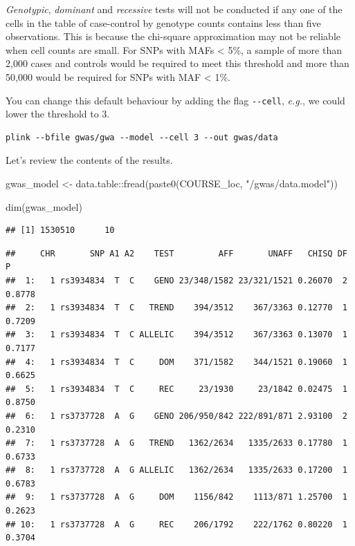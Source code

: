 \documentclass[
]{book}
\newenvironment{Shaded}{\begin{snugshade}}{\end{snugshade}}
\newcommand{\DecValTok}[1]{\textcolor[rgb]{0.00,0.00,0.81}{#1}}
\newcommand{\FunctionTok}[1]{\textcolor[rgb]{0.00,0.00,0.00}{#1}}
\newcommand{\NormalTok}[1]{#1}
\newcommand{\OtherTok}[1]{\textcolor[rgb]{0.56,0.35,0.01}{#1}}
\newcommand{\SpecialCharTok}[1]{\textcolor[rgb]{0.00,0.00,0.00}{#1}}
\newcommand{\StringTok}[1]{\textcolor[rgb]{0.31,0.60,0.02}{#1}}
\begin{document}
\emph{Genotypic}, \emph{dominant} and \emph{recessive} tests will not be conducted if any one of the cells in the table of case-control by genotype counts contains less than five observations. This is because the chi-square approximation may not be reliable when cell counts are small. For SNPs with MAFs \textless{} 5\%, a sample of more than 2,000 cases and controls would be required to meet this threshold and more than 50,000 would be required for SNPs with MAF \textless{} 1\%.

You can change this default behaviour by adding the flag \texttt{-\/-cell}, \emph{e.g.}, we could lower the threshold to 3.

\begin{verbatim}
plink --bfile gwas/gwa --model --cell 3 --out gwas/data
\end{verbatim}

Let's review the contents of the results.

\begin{Shaded}
\begin{Highlighting}[]
\NormalTok{gwas\_model }\OtherTok{\textless{}{-}}\NormalTok{ data.table}\SpecialCharTok{::}\FunctionTok{fread}\NormalTok{(}\FunctionTok{paste0}\NormalTok{(COURSE\_loc, }\StringTok{"/gwas/data.model"}\NormalTok{))}

\FunctionTok{dim}\NormalTok{(gwas\_model)}
\end{Highlighting}
\end{Shaded}

\begin{verbatim}
## [1] 1530510      10
\end{verbatim}

\begin{Shaded}
\end{Shaded}

\begin{verbatim}
##     CHR       SNP A1 A2    TEST         AFF       UNAFF   CHISQ DF      P
##  1:   1 rs3934834  T  C    GENO 23/348/1582 23/321/1521 0.26070  2 0.8778
##  2:   1 rs3934834  T  C   TREND    394/3512    367/3363 0.12770  1 0.7209
##  3:   1 rs3934834  T  C ALLELIC    394/3512    367/3363 0.13070  1 0.7177
##  4:   1 rs3934834  T  C     DOM    371/1582    344/1521 0.19060  1 0.6625
##  5:   1 rs3934834  T  C     REC     23/1930     23/1842 0.02475  1 0.8750
##  6:   1 rs3737728  A  G    GENO 206/950/842 222/891/871 2.93100  2 0.2310
##  7:   1 rs3737728  A  G   TREND   1362/2634   1335/2633 0.17780  1 0.6733
##  8:   1 rs3737728  A  G ALLELIC   1362/2634   1335/2633 0.17200  1 0.6783
##  9:   1 rs3737728  A  G     DOM    1156/842    1113/871 1.25700  1 0.2623
## 10:   1 rs3737728  A  G     REC    206/1792    222/1762 0.80220  1 0.3704
\end{verbatim}
\end{document}

